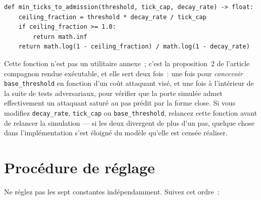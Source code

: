 \documentclass[11pt]{article}
\begin{document}
\begin{lstlisting}
def min_ticks_to_admission(threshold, tick_cap, decay_rate) -> float:
    ceiling_fraction = threshold * decay_rate / tick_cap
    if ceiling_fraction >= 1.0:
        return math.inf
    return math.log(1 - ceiling_fraction) / math.log(1 - decay_rate)
\end{lstlisting}

Cette fonction n'est pas un utilitaire annexe~; c'est la proposition~2 de
l'article compagnon rendue exécutable, et elle sert deux fois~: une fois
pour \emph{concevoir} \texttt{base\_threshold} en fonction d'un coût
attaquant visé, et une fois à l'intérieur de la suite de tests
adversariaux, pour vérifier que la porte simulée admet effectivement un
attaquant saturé au pas prédit par la forme close. Si vous modifiez
\texttt{decay\_rate}, \texttt{tick\_cap} ou \texttt{base\_threshold},
relancez cette fonction avant de relancer la simulation --- si les deux
divergent de plus d'un pas, quelque chose dans l'implémentation s'est
éloigné du modèle qu'elle est censée réaliser.

\section{Procédure de réglage}
\label{sec:tuning}

Ne réglez pas les sept constantes indépendamment. Suivez cet ordre~:
\end{document}
